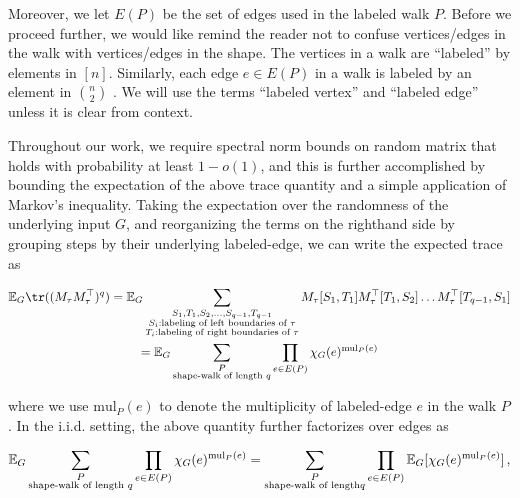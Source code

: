 


Moreover, we let $E(P)$ be the set of edges used in the labeled walk $P$.
Before we proceed further, we would like remind the reader not to confuse vertices/edges in the walk with vertices/edges in the shape. The vertices in a walk are “labeled” by elements in $[n]$. Similarly, each edge $e\in E(P)$ in a walk is labeled by an element in $\binom{n}{2}$ . We will use the terms “labeled vertex” and “labeled edge” unless it is clear from context.\par




Throughout our work, we require spectral norm bounds on random matrix that holds with probability at least $1-o(1)$, and this is further accomplished by bounding the expectation of the above trace quantity and a simple application of Markov’s inequality. Taking the expectation over the randomness of the underlying input $G$, and reorganizing the terms on the righthand side by grouping steps by their underlying labeled-edge,
we can write the expected trace as\par




\[\begin{gathered}
\displaystyle\mathbb{E}_{G}\tr((M_{\tau}M_{\tau}^{\top})^{q}) \displaystyle=\mathbb{E}_{G}\sum_{\begin{subarray}{c}S_{1},T_{1},S_{2},\dots,S_{q-1},T_{q-1}\\
S_{i}:\text{labeling of left boundaries of $\tau$}\\
T_{i}:\text{labeling of right boundaries of $\tau$}\end{subarray}}M_{\tau}[S_{1},T_{1}]M_{\tau}^{\top}[T_{1},S_{2}]\dots M_{\tau}^{\top}[T_{q-1},S_{1}] \\
\displaystyle=\mathbb{E}_{G}\sum_{\begin{subarray}{c}P\\
\text{shape-walk of length }q\end{subarray}}\prod_{e\in E(P)}\chi_{G}(e)^{\text{mul}_{P}(e)}
\end{gathered}\]


where we use $\text{mul}_{P}(e)$ to denote the multiplicity of labeled-edge $e$ in the walk $P$.
In the i.i.d. setting, the above quantity further factorizes over edges as\par


\[\begin{gathered}
\mathbb{E}_{G}\sum_{\begin{subarray}{c}P\\
\text{shape-walk of length }q\end{subarray}}\prod_{e\in E(P)}\chi_{G}(e)^{\text{mul}_{P}(e)}=\sum_{\begin{subarray}{c}P\\
\text{shape-walk of length}q\end{subarray}}\prod_{e\in E(P)}\mathbb{E}_{G}[\chi_{G}(e)^{\text{mul}_{P}(e)}]\,,
\end{gathered}\]


